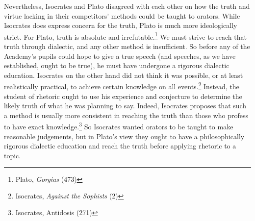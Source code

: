 \begin{multicols}{2}
Nevertheless, Isocrates and Plato disagreed with each other on how the
truth and virtue lacking in their competitors' methods could be taught
to orators. While Isocrates does express concern for the truth, Plato is
much more ideologically strict. For Plato, truth is absolute and
irrefutable.\footnote{\textsuperscript{} Plato, \emph{Gorgias} (473)} We
must strive to reach that truth through dialectic, and any other method
is insufficient. So before any of the Academy's pupils could hope to
give a true speech (and speeches, as we have established, ought to be
true), he must have undergone a rigorous dialectic education. Isocrates
on the other hand did not think it was possible, or at least
realistically practical, to achieve certain knowledge on all
events.\footnote{\textsuperscript{} Isocrates, \emph{Against the
		Sophists} (2) } Instead, the student of rhetoric ought to use his
experience and conjecture to determine the likely truth of what he was
planning to say. Indeed, Isocrates proposes that such a method is
usually more consistent in reaching the truth than those who profess to
have exact knowledge.\footnote{\textsuperscript{} Isocrates, Antidosis
	(271)} So Isocrates wanted orators to be taught to make reasonable
judgements, but in Plato's view they ought to have a philosophically
rigorous dialectic education and reach the truth before applying
rhetoric to a topic.


\end{multicols}
